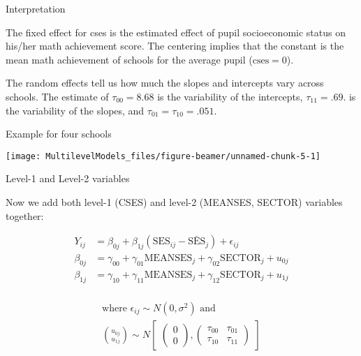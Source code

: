 \documentclass[10pt,ignorenonframetext,]{beamer}
\begin{document}
\begin{frame}{Interpretation}

The fixed effect for cses is the estimated effect of pupil socioeconomic
status on his/her math achievement score. The centering implies that the
constant is the mean math achievement of schools for the average pupil
(\(\text{cses} = 0\)).

The random effects tell us how much the slopes and intercepts vary
across schools. The estimate of \(\tau_{00} = 8.68\) is the variability
of the intercepts, \(\tau_{11} = .69.\) is the variability of the
slopes, and \(\tau_{01} = \tau_{10} = .051.\)

\end{frame}

\begin{frame}{Example for four schools}

\begin{center}\texttt{[image: MultilevelModels\_files/figure-beamer/unnamed-chunk-5-1]} \end{center}

\end{frame}

\begin{frame}{Level-1 and Level-2 variables}

Now we add both level-1 (CSES) and level-2 (MEANSES, SECTOR) variables
together:

\[
\begin{aligned}
Y_{ij} &= \beta_{0j} + \beta_{1j} (\mathrm{SES}_{ij}-\bar{\mathrm{SES}}_j) + \epsilon_{ij}\\
\beta_{0j} &= \gamma_{00} + \gamma_{01}\mathrm{MEANSES}_j + \gamma_{02} \mathrm{SECTOR}_j + u_{0j} \\
\beta_{1j} &= \gamma_{10} + \gamma_{11}\mathrm{MEANSES}_j + \gamma_{12} \mathrm{SECTOR}_j +u_{1j} \\
\end{aligned}
\]

\[
\begin{gathered}
\text{where } \epsilon_{ij} \sim N(0,\sigma^2) \text{ and } \\
  \binom{u_{0j}}{u_{1j}} \sim
   N \begin{bmatrix} \begin{pmatrix} 0\\0 \end{pmatrix},
      \begin{pmatrix} \tau_{00}&\tau_{01}\\\tau_{10}&\tau_{11} \end{pmatrix}
      \end{bmatrix}
\end{gathered}
\]

\end{frame}
\end{document}
